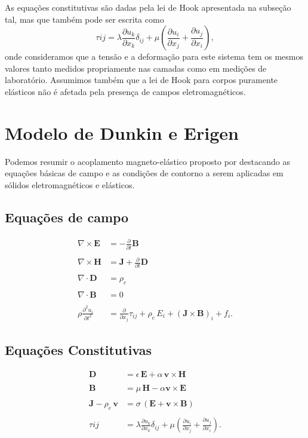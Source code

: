 As equa\c{c}\~oes constitutivas s\~ao dadas pela lei de Hook apresentada na subse\c{c}\~ao tal, mas que tamb\'em pode ser escrita como
\begin{equation}
\tau{ij}=\lambda\frac{\partial u_k}{\partial x_k}\delta_{ij}+\mu\left(\frac{\partial u_i}{\partial x_j}+\frac{\partial u_j}{\partial x_i}\right),
\end{equation}
onde consideramos que a tens\~ao e a deforma\c{c}\~ao para  este sistema tem os mesmos valores tanto medidos propriamente nas camadas como em medi\c{c}\~oes de laborat\'orio. Assumimos tamb\'em que a lei de Hook para corpos puramente el\'asticos n\~ao \'e afetada pela presen\c{c}a de campos eletromagn\'eticos. 


\section{Modelo de Dunkin e Erigen}

Podemos resumir o acoplamento magneto-el\'astico proposto por \cite{erigen_1963} destacando as equa\c{c}\~oes b\'asicas de campo e as condi\c{c}\~oes de contorno a serem aplicadas em s\'olidos eletromagn\'eticos e el\'asticos.

\subsection{Equa\c{c}\~oes de campo}

\begin{align*}
\nabla\times\mathbf{E}&=-\frac{\partial}{\partial t}\mathbf{B}\\\\
\nabla\times\mathbf{H}&=\mathbf{J}+\frac{\partial}{\partial t}\mathbf{D}\\\\
\nabla\cdot\mathbf{D}&=\rho_e\\\\
\nabla\cdot\mathbf{B}&=0\\\\
\rho\frac{\partial^2 u_i}{\partial t^2}&=\frac{\partial}{\partial x_j}\tau_{ij}+\rho_e\,E_i+(\mathbf{J}\times\mathbf{B})_i+f_i.
\end{align*}

\subsection{Equa\c{c}\~oes Constitutivas}

\begin{align*}
\mathbf{D}&=\epsilon\,\mathbf{E}+\alpha\,\mathbf{v}\times\mathbf{H}\\\\
\mathbf{B}&=\mu\,\mathbf{H}-\alpha\mathbf{v}\times\mathbf{E}\\\\
\mathbf{J}-\rho_e\,\mathbf{v}&=\sigma\,(\mathbf{E}+\mathbf{v}\times\mathbf{B})\\\\
\tau{ij}&=\lambda\frac{\partial u_k}{\partial x_k}\delta_{ij}+\mu\left(\frac{\partial u_i}{\partial x_j}+\frac{\partial u_j}{\partial x_i}\right).
\end{align*}


